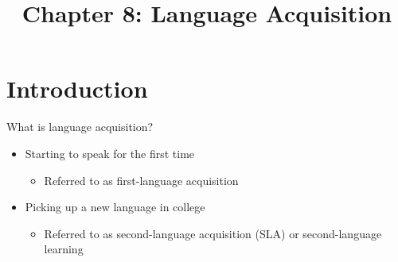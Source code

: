 \documentclass{beamer}
\title{Chapter 8: Language Acquisition}
\begin{document}
    \begin{frame}
        \titlepage
    \end{frame}
    \begin{frame}
        \tableofcontents
    \end{frame}
    \AtBeginSection[]
        {
        \begin{frame}
            \tableofcontents[currentsection]
        \end{frame}
        }
    \section{Introduction}
        \begin{frame}{What is language acquisition?}
            \begin{itemize}
                \item<2-> Starting to speak for the first time
                    \begin{itemize}
                        \item<3-> Referred to as \alert{first-language acquisition}
                    \end{itemize}
                \item<2-> Picking up a new language in college
                    \begin{itemize}
                        \item<3-> Referred to as \alert{second-language acquisition (SLA)} or second-language learning
                    \end{itemize}
            \end{itemize}
        \end{frame}
\end{document}
